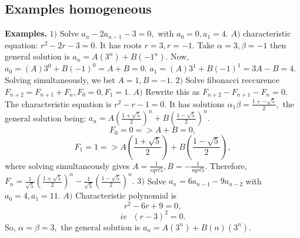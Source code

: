 \documentclass{article}
\begin{document}
\subsection{Examples homogeneous}
\textbf{Examples. }
\newline
\newline
$1) $ Solve $a_n - 2a_{n - 1} - 3 = 0,$ with $a_0 = 0, a_1 = 4.$
\newline
\newline
$A) $ characteristic equation: $r^2 - 2r - 3 = 0.$
\newline
\newline
It has roots $r = 3, r = -1.$ Take $\alpha = 3, \beta = -1$ then general solution is $a_n = A(3^n) + B(-1^n).$
\newline
Now, $a_0 = (A)3^0 + B(-1)^0 = A + B = 0.$
\newline
$a_1 = (A)3^1 + B(-1)^1 = 3A - B = 4.$
\newline
\newline
Solving simultaneously, we bet $A = 1, B = -1.$
\newline
\newline
$2) $ Solve fibonacci reccurence $F_{n + 2} = F_{n + 1} + F_n, F_0 = 0, F_1 = 1.$
\newline
\newline
$A) $ Rewrite this as $F_{n + 2} - F_{n + 1} - F_n = 0.$
\newline
The characteristic equation is $r^2 - r - 1 = 0.$
\newline
\newline
It has solutions $\alpha_1 \beta = \frac{1 +- \sqrt{5}}{2},$ the general solution being: $a_n = A(\frac{1 + \sqrt{5}}{2})^n + B(\frac{1 - \sqrt{5}}{2})^n.$
\newline
\newline
$$F_0 = 0 => A + B = 0,$$
$$F_1 = 1 => A(\frac{1 + \sqrt{5}}{2}) + B(\frac{1 - \sqrt{5}}{2}),$$
where solving simultaneously gives $A = \frac{1}{sqrt{5}}, B = -\frac{1}{sqrt{5}}.$
\newline
\newline
Therefore, $F_n = \frac{1}{\sqrt{5}}(\frac{1 + \sqrt{5}}{2})^n - \frac{1}{\sqrt{5}}(\frac{1 - \sqrt{5}}{2})^n.$
\newline
\newline
$3) $ Solve $a_n = 6a_{n - 1} - 9a_{n - 2}$ with $a_0 = 4, a_1 = 11.$
\newline
\newline
$A) $ Characteristic polynomial is 
$$r^2 - 6r + 9 = 0,$$
$$ie \text{ } (r - 3)^2 = 0.$$
So, $\alpha = \beta = 3,$ the general solution is $a_n = A(3^n) + B(n)(3^n).$
\end{document}
